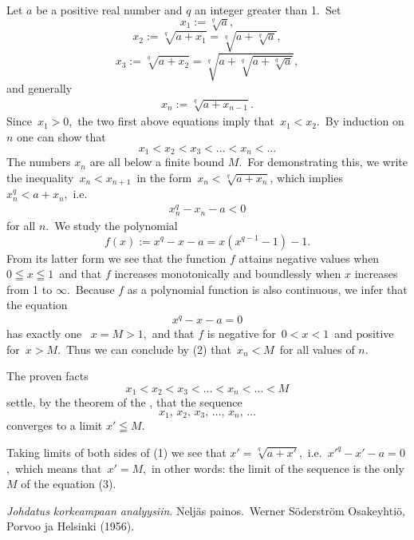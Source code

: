 \documentclass[12pt]{article}
\theoremstyle{definition}
\begin{document}
Let $a$ be a positive real number and $q$ an integer greater than 1.\, Set
$$x_1 := \sqrt[q]{a},$$
$$x_2 := \sqrt[q]{a+x_1} = \sqrt[q]{a+\sqrt[q]{a}},$$
$$x_3 := \sqrt[q]{a+x_2} = \sqrt[q]{a+\sqrt[q]{a+\sqrt[q]{a}}},$$
and generally
\begin{align}
x_n := \sqrt[q]{a+x_{n-1}}.
\end{align}
Since\, $x_1 > 0$,\, the two first above equations imply that\, $x_1 < x_2$.\, By induction on $n$ one can show that
$$x_1 < x_2 < x_3 < \ldots < x_n < \ldots$$
The numbers $x_n$ are all below a finite bound $M$.\, For demonstrating this, we write the inequality \,$x_n < x_{n+1}$\, in the form \,$x_n < \sqrt[q]{a+x_n}$, which implies \, $x_n^q < a+x_n$,\, i.e.
\begin{align}
x_n^q-x_n-a < 0
\end{align}
for all $n$.\, We study the polynomial
$$f(x) := x^q-x-a = x(x^{q-1}-1)-1.$$
From its latter form we see that the function $f$ attains negative values when\, $0 \leqq x \leqq 1$\, and that $f$ increases monotonically and boundlessly when $x$ increases from 1 to $\infty$.\, Because $f$ as a polynomial function is also continuous, we infer that the equation
\begin{align}
x^q-x-a = 0
\end{align}
has exactly one   \, $x = M > 1$,\, and that $f$ is negative for\, $0 < x < 1$\, and positive for\, $x > M$.\, Thus we can conclude by (2) that\, $x_n < M$\, for all values of $n$. 

The proven facts
$$x_1 < x_2 < x_3 < \ldots < x_n < \ldots < M$$
settle, by the theorem of the , that the sequence 
$$x_1,\,x_2,\,x_3,\,\ldots,\,x_n,\,\ldots$$
converges to a limit $x' \leqq M$.

Taking limits of both sides of (1) we see that $x' = \sqrt[q]{a+x'}$,\, i.e.\, $x'^q-x'-a = 0$,\, which means that\, $x' = M$,\, in other words: the limit of the sequence is the only  $M$ of the equation (3).\\

\begin{thebibliography}{9}
 {\em Johdatus korkeampaan analyysiin}. Nelj\"as painos.\, Werner S\"oderstr\"om Osakeyhti\"o, Porvoo ja Helsinki (1956).
\end{thebibliography}


\end{document}
